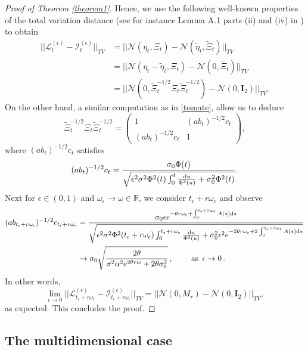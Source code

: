 \documentclass[12pt,thmsa]{article}
\begin{document}
\begin{proof}[Proof of Theorem \ref{theorem1}]
	Hence, we use the following well-known properties  of the total variation distance (see for instance Lemma A.1 parts (ii) and (iv) in \cite{BJ1})  to obtain
	\[
	\begin{split}
		||\mathcal{L}^{(\epsilon)}_{t}-\mathcal{I}^{(\epsilon)}_{t}||_{TV}&=|| \mathcal{N}(\eta_t, \Xi_t)-\mathcal{N}(\widetilde{\eta}_t, \widetilde{\Xi}_t)||_{TV}\\
		&=|| \mathcal{N}(\eta_t-\widetilde{\eta}_t, \Xi_t)-\mathcal{N}(0, \widetilde{\Xi}_t)||_{TV}\\
		&=|| \mathcal{N}(0, \widetilde{\Xi}_t^{-1/2}\Xi_t\widetilde{\Xi}_t^{-1/2})-\mathcal{N}(0, \mathbf{I}_2)||_{TV}.
	\end{split}
	\]
	On the other hand, a similar computation as in \eqref{tomate}, allow us to deduce
	\[
	\widetilde{\Xi}_t^{-1/2}\Xi_t\widetilde{\Xi}_t^{-1/2}=\begin{pmatrix}
		1 & (ab_t)^{-1/2}c_t\\
		(ab_t)^{-1/2}c_t & 1
	\end{pmatrix},
	\]
	where $(ab_t)^{-1/2}c_t$ satisfies
	$$(ab_t)^{-1/2}c_t=\frac{\sigma_0\Phi(t)}{\sqrt{\epsilon^2\sigma^2\Phi^2(t)\int_0^{ t}\frac{{\rm d}u}{\Phi^2(u)}+\sigma_0^2\Phi^2(t)}} .$$ 
	Next for $\epsilon\in(0,1)$ and $\omega_\epsilon\to\omega\in \mathbb{R}$, we consider
	$t_\epsilon +r\omega_\epsilon$ 
	and observe 
	\[
	\begin{split}
		(ab_{t_\epsilon +r\omega_\epsilon})^{-1/2}c_{t_\epsilon +r\omega_\epsilon}&=\frac{\sigma_0\epsilon e^{-\theta r\omega_\epsilon+ \int_0^{t_\epsilon +r\omega_\epsilon}A(s){\rm d}s}}{\sqrt{\epsilon^2\sigma^2\Phi^2(t_\epsilon +r\omega_\epsilon)\int_0^{ t_\epsilon +r\omega_\epsilon}\frac{{\rm d}u}{\Phi^2(u)}+\sigma_0^2\epsilon^2 e^{-2\theta r\omega_\epsilon+ 2\int_0^{t_\epsilon +r\omega_\epsilon}A(s){\rm d}s}}}\\
		& \to\sigma_0\sqrt{\frac{2\theta}{\sigma^2 \alpha^2e^{2\theta rw}+2\theta\sigma_0^2 }}\,,\qquad\mbox{ as }\,\epsilon\to 0\,.
	\end{split}
	\]
	In other words,
	\[
	\lim_{\epsilon\to 0}||\mathcal{L}^{(\epsilon)}_{t_\epsilon +r\omega_\epsilon}-\mathcal{I}^{(\epsilon)}_{t_\epsilon +r\omega_\epsilon}||_{TV}=||\mathcal{N}(0, M_r)-\mathcal{N}(0,\mathbf{I}_2)||_{TV},
	\]
	as expected. This concludes  the proof.
\end{proof}


\subsection{The multidimensional case}
\end{document}
